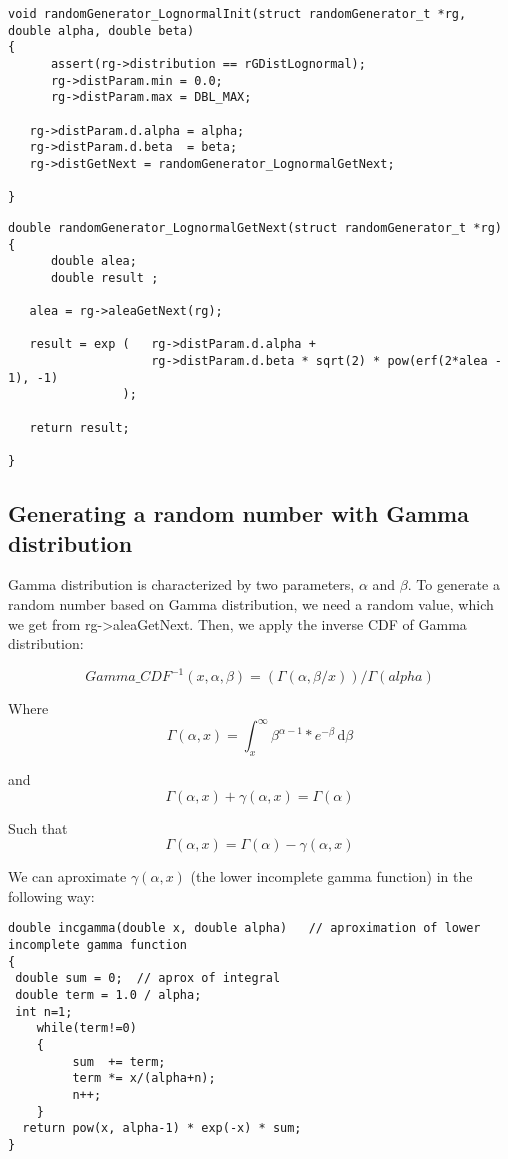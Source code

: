 \begin{verbatim}
void randomGenerator_LognormalInit(struct randomGenerator_t *rg, double alpha, double beta)
{
      assert(rg->distribution == rGDistLognormal);   
      rg->distParam.min = 0.0;
      rg->distParam.max = DBL_MAX;
  
   rg->distParam.d.alpha = alpha;
   rg->distParam.d.beta  = beta; 
   rg->distGetNext = randomGenerator_LognormalGetNext;

}
\end{verbatim}

\begin{verbatim}
double randomGenerator_LognormalGetNext(struct randomGenerator_t *rg)
{  
      double alea;
      double result ;
   
   alea = rg->aleaGetNext(rg);

   result = exp (   rg->distParam.d.alpha + 
                    rg->distParam.d.beta * sqrt(2) * pow(erf(2*alea - 1), -1) 
                );

   return result;

}  
\end{verbatim}

\subsection{Generating a random number with Gamma distribution}
\label{gamma_dist}

Gamma distribution is characterized by two parameters, $\alpha$ and $\beta$.
To generate a random number based on Gamma distribution, we need a random value, which we get from rg->aleaGetNext. Then, we apply the inverse CDF of Gamma distribution:
  
  $$ Gamma\_CDF^{-1}(x, \alpha, \beta) = (\Gamma(\alpha, \beta/x))/\Gamma(alpha) $$

   Where $$\Gamma(\alpha, x) = \int_x^\infty \! \beta^{\alpha-1}*e^{-\beta}\, \mathrm{d}\beta $$

   and $$\Gamma(\alpha, x) + \gamma(\alpha, x) = \Gamma(\alpha) $$

   Such that $$ \Gamma(\alpha, x) = \Gamma(\alpha) - \gamma(\alpha, x) $$

 We can aproximate $\gamma(\alpha, x)$ (the lower incomplete gamma function) in the following way:
\begin{verbatim}
double incgamma(double x, double alpha)   // aproximation of lower incomplete gamma function
{
 double sum = 0;  // aprox of integral
 double term = 1.0 / alpha;
 int n=1; 
    while(term!=0)
    {
         sum  += term;
         term *= x/(alpha+n);
         n++;
    }
  return pow(x, alpha-1) * exp(-x) * sum;
}
\end{verbatim}

